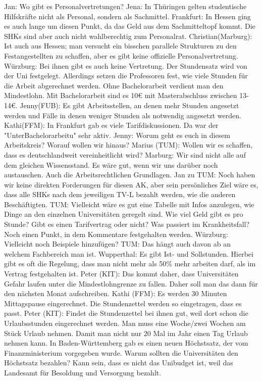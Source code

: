\begin{outline}
      \1 Jan: Wo gibt es Personalvertretungen?
          \2 Jena: In Thüringen gelten studentische Hilfskräfte nicht als Personal, sondern als Sachmittel.
          \2 Frankfurt: In Hessen ging es auch lange um diesen Punkt, da das Geld aus dem Sachmitteltopf kommt. Die SHKs sind aber auch nicht wahlberechtig zum Personalrat.
          \2 Christian(Marburg): Ist auch aus Hessen; man versucht ein bisschen parallele Strukturen zu den Festangestellten zu schaffen, aber es gibt keine offizielle Personalvertretung.
          \2 Würzburg: Bei ihnen gibt es auch keine Vertretung. Der Stundensatz wird von der Uni festgelegt. Allerdings setzen die Professoren fest, wie viele Stunden für die Arbeit abgerechnet werden. Ohne Bachelorarbeit verdient man den Mindestlohn. Mit Bachelorarbeit sind es 10€ mit Masterabschluss zwischen 13-14€.
          \2 Jenny(FUB): Es gibt Arbeitsstellen, an denen mehr Stunden angesetzt werden und Fälle in denen weniger Stunden als notwendig angesetzt werden.
          \2 Kathi(FFM): In Frankfurt gab es viele Tarifdiskussionen. Da war der "UnterBachelorarbeitu" sehr aktiv.
      \1 Jenny: Worum geht es euch in diesem Arbeitskreis? Worauf wollen wir hinaus?
          \2 Marius (TUM): Wollen wir es schaffen, dass es deutschlandweit vereinheitlicht wird?
          \2 Marburg: Wir sind nicht alle auf dem gleichen Wissensstand. Es wäre gut, wenn wir uns darüber noch austauschen. Auch die Arbeitsrechtlichen Grundlagen.
          \2 Jan zu TUM: Noch haben wir keine direkten Forderungen für diesen AK, aber sein persönliches Ziel wäre es, dass alle SHKs nach dem jeweiligen TV-L bezahlt werden, wie die anderen Beschäftigten.
          \2 TUM: Vielleicht wäre es gut eine Tabelle mit Infos anzulegen, wie Dinge an den einzelnen Universitäten geregelt sind.
              \3 Wie viel Geld gibt es pro Stunde?
              \3 Gibt es einen Tarifvertrag oder nicht?
              \3 Was passiert im Krankheitsfall? \\
              \3 Noch einen Punkt, in dem Kommentare festgehalten werden.
          \2 Würzburg: Vielleicht noch Beispiele hinzufügen?
          \2 TUM: Das hängt auch davon ab an welchem Fachbereich man ist.
      \1 Wupperthal: Es gibt Ist- und Sollstunden. Hierbei gibt es oft die Regelung, dass man nicht mehr als 50\% mehr arbeiten darf, als im Vertrag festgehalten ist.
          \2 Peter (KIT): Das kommt daher, dass Universitäten Gefahr laufen unter die Mindestlohngrenze zu fallen. Daher soll man das dann für den nächsten Monat aufschreiben.
          \2 Kathi (FFM): Es werden 30 Minuten Mittagspause eingerechnet. Die Stundenzettel werden so eingetragen, dass es passt.
          \2 Peter (KIT): Findet die Stundenzettel bei ihnen gut, weil dort schon die Urlaubsstunden eingerechnet werden. Man muss eine Woche/zwei Wochen am Stück Urlaub nehmen. Damit man nicht nur 20 Mal im Jahr einen Tag Urlaub nehmen kann. In Baden-Württemberg gab es einen neuen Höchstsatz, der vom Finanzministerium vorgegeben wurde. Warum sollten die Universitäten den Höchstsatz bezahlen? Kann sein, dass es nicht das Unibudget ist, weil das Landesamt für Besoldung und Versorgung bezahlt.
    \end{outline}


